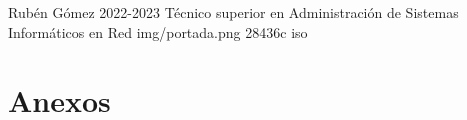 \documentclass{\ClassPath/yukibook}
\begin{document}
    {Rubén Gómez}  %
    {2022-2023}    %
    {Técnico superior en Administración de \linebreak Sistemas Informáticos en Red} %
    {}%
    {}%
    {img/portada.png} %
    {28436c}
    {iso} %

    \coverpage

    \tableofcontents

    \graphicspath{{../../../temas_comunes/sistemas_de_numeracion/img/}}
    


    \graphicspath{{../../../DAM/1/sistemas_informaticos/img/si}}
    

    \graphicspath{{img/iso/}}

    \graphicspath{{img/iso/}}
    

    \part{Anexos}
    
    
\end{document}
